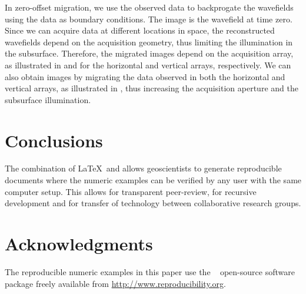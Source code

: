 
In zero-offset migration, we use the observed data to backprogate the
wavefields using the data as boundary conditions. The image is the
wavefield at time zero. Since we can acquire data at different
locations in space, the reconstructed wavefields depend on the
acquisition geometry, thus limiting the illumination in the
subsurface. Therefore, the migrated images depend on the acquisition
array, as illustrated in  and  for the horizontal
and vertical arrays, respectively. 
We can also obtain images by migrating the data observed in both the
horizontal and vertical arrays, as illustrated in , thus
increasing the acquisition aperture and the subsurface illumination.



\section{Conclusions}
The combination of \LaTeX\ and \mg allows geoscientists to generate
reproducible documents where the numeric examples can be verified by
any user with the same computer setup. This allows for transparent
peer-review, for recursive development and for transfer of technology
between collaborative research groups.

\section{Acknowledgments}
The reproducible numeric examples in this paper use the \mg~
open-source software package freely available from
\url{http://www.reproducibility.org}.



